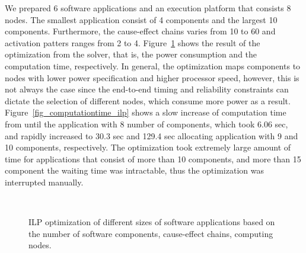 We prepared 6 software applications and an execution platform that consists 8 nodes. The smallest application consist of 4 components and the largest 10 components. Furthermore, the cause-effect chains varies from 10 to 60 and activation patters ranges from 2 to 4. Figure~\ref{fig_ilp_results} shows the result of the optimization from the \cplex{} solver, that is, the power consumption and the computation time, respectively. In general, the optimization maps components to nodes with lower power specification and higher processor speed, however, this is not always the case since the end-to-end timing and reliability constraints can dictate the selection of different nodes, which consume more power as a result. Figure~\ref{fig_computationtime_ilp} shows a slow increase of computation time from until the application with 8 number of components, which took  6.06 sec, and rapidly increased to 30.3 sec and 129.4 sec allocating application with 9 and 10 components, respectively. The optimization took extremely large amount of time for applications that consist of more than 10 components, and more than 15 component the waiting time was intractable, thus the optimization was interrupted manually. 
\begin{figure}[h] 
	\centering
	 ~
	\caption{ILP optimization of different sizes of software applications based on the number of software components, cause-effect chains, computing nodes.} \label{fig_ilp_results}
\end{figure}

